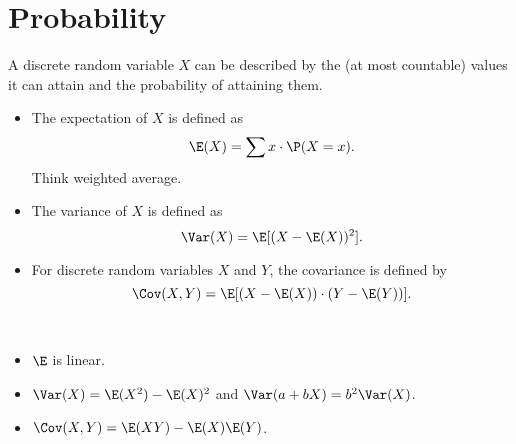 \documentclass[oneside,reqno,letterpaper]{amsart}
\begin{document}
\section{Probability}
\begin{definition}
  A discrete random variable \(X\) can be described by the (at most countable) values it can attain and the probability of attaining them.

  \begin{itemize}
  \item 
    The expectation of \(X\) is defined as 
    \[
      \E(X) = \sum x \cdot \P(X = x) . 
    \] 
    Think weighted average. 

  \item 
    The variance of \(X\) is defined as 
    \[
      \Var(X) = \E[(X - \E(X))^2] . 
    \] 

  \item For discrete random variables \(X\) and \(Y\), the covariance is defined by
    \[
      \Cov(X, Y) = \E[(X - \E(X)) \cdot (Y - \E(Y))] .
    \] 
  \end{itemize}
\end{definition}

\begin{proposition}~
  \begin{itemize}
    \item \(\E\) is linear. 
    \item \(\Var(X) = \E(X^2) - \E(X)^2\) and 
      \(\Var(a + bX) = b^2 \Var(X)\). 
    \item \(\Cov(X, Y) = \E(XY) - \E(X) \E(Y)\). 
  \end{itemize}
\end{proposition}
\end{document}
